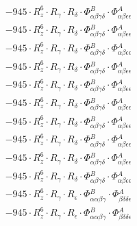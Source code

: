 \documentclass{article}
\begin{document}
\begin{subequations}
\begin{gather}
\begin{array}{c}
 \\[0.2em] 		 - 945 \cdot R_{z}^{6} \cdot R_{\gamma{}} \cdot R_{\delta{}} \cdot \Phi{}^{B}_{\alpha{}\beta{}\gamma{}\delta{}} \cdot \Phi{}^{A}_{\alpha{}\beta{}\epsilon{}\epsilon{}} 
 \\[0.2em] 		 - 945 \cdot R_{z}^{6} \cdot R_{\gamma{}} \cdot R_{\delta{}} \cdot \Phi{}^{B}_{\alpha{}\beta{}\gamma{}\delta{}} \cdot \Phi{}^{A}_{\alpha{}\beta{}\epsilon{}\epsilon{}} 
 \\[0.2em] 		 - 945 \cdot R_{z}^{6} \cdot R_{\gamma{}} \cdot R_{\delta{}} \cdot \Phi{}^{B}_{\alpha{}\beta{}\gamma{}\delta{}} \cdot \Phi{}^{A}_{\alpha{}\beta{}\epsilon{}\epsilon{}} 
 \\[0.2em] 		 - 945 \cdot R_{z}^{6} \cdot R_{\gamma{}} \cdot R_{\delta{}} \cdot \Phi{}^{B}_{\alpha{}\beta{}\gamma{}\delta{}} \cdot \Phi{}^{A}_{\alpha{}\beta{}\epsilon{}\epsilon{}} 
 \\[0.2em] 		 - 945 \cdot R_{z}^{6} \cdot R_{\gamma{}} \cdot R_{\delta{}} \cdot \Phi{}^{B}_{\alpha{}\beta{}\gamma{}\delta{}} \cdot \Phi{}^{A}_{\alpha{}\beta{}\epsilon{}\epsilon{}} 
 \\[0.2em] 		 - 945 \cdot R_{z}^{6} \cdot R_{\gamma{}} \cdot R_{\delta{}} \cdot \Phi{}^{B}_{\alpha{}\beta{}\gamma{}\delta{}} \cdot \Phi{}^{A}_{\alpha{}\beta{}\epsilon{}\epsilon{}} 
 \\[0.2em] 		 - 945 \cdot R_{z}^{6} \cdot R_{\gamma{}} \cdot R_{\delta{}} \cdot \Phi{}^{B}_{\alpha{}\beta{}\gamma{}\delta{}} \cdot \Phi{}^{A}_{\alpha{}\beta{}\epsilon{}\epsilon{}} 
 \\[0.2em] 		 - 945 \cdot R_{z}^{6} \cdot R_{\gamma{}} \cdot R_{\delta{}} \cdot \Phi{}^{B}_{\alpha{}\beta{}\gamma{}\delta{}} \cdot \Phi{}^{A}_{\alpha{}\beta{}\epsilon{}\epsilon{}} 
 \\[0.2em] 		 - 945 \cdot R_{z}^{6} \cdot R_{\gamma{}} \cdot R_{\delta{}} \cdot \Phi{}^{B}_{\alpha{}\beta{}\gamma{}\delta{}} \cdot \Phi{}^{A}_{\alpha{}\beta{}\epsilon{}\epsilon{}} 
 \\[0.2em] 		 - 945 \cdot R_{z}^{6} \cdot R_{\gamma{}} \cdot R_{\delta{}} \cdot \Phi{}^{B}_{\alpha{}\beta{}\gamma{}\delta{}} \cdot \Phi{}^{A}_{\alpha{}\beta{}\epsilon{}\epsilon{}} 
 \\[0.2em] 		 - 945 \cdot R_{z}^{6} \cdot R_{\gamma{}} \cdot R_{\epsilon{}} \cdot \Phi{}^{B}_{\alpha{}\alpha{}\beta{}\gamma{}} \cdot \Phi{}^{A}_{\beta{}\delta{}\delta{}\epsilon{}} 
 \\[0.2em] 		 - 945 \cdot R_{z}^{6} \cdot R_{\gamma{}} \cdot R_{\epsilon{}} \cdot \Phi{}^{B}_{\alpha{}\alpha{}\beta{}\gamma{}} \cdot \Phi{}^{A}_{\beta{}\delta{}\delta{}\epsilon{}} 

\end{array}
\end{gather}
\end{subequations}
\end{document}
